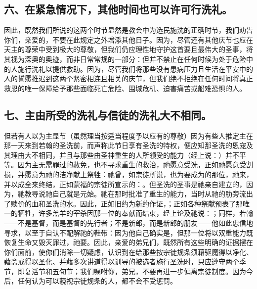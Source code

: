 
\subsection{六、在紧急情况下，其他时间也可以许可行洗礼。}

因此，既然我们所说的这两个时节显然是教会中为选民施洗的正确时节，我们劝告你们，亲爱的，不要在此规定之外增添其他日子。因为，尽管还有其他庆节也应在天主的尊荣中受到极大的尊敬，但我们仍应理性地守护这首要且最伟大的圣事，将其视为深奥的奥迹，而非日常常规的一部分：但并不禁止在任何时候为处于危险中的人施行洗礼以提供救助。因为，尽管我们将那些没有患病压力且生活在平安中的人的誓愿推迟到这两个紧密相连且相关的庆节，但我们绝不拒绝在任何时间将真正救恩的唯一保障给予那些面临死亡危险、围城危机、迫害痛苦或船难恐惧的人。\par


\subsection{七、主由所受的洗礼与信徒的洗礼大不相同。}

但若有人以为主显节（虽然理当按适当程度予以应有的尊敬）因为有些人推定主在那一天来到若翰的圣洗前，而声称此节日享有圣洗的特权，便应知那圣洗的恩宠及其理由大不相同，并且与那些由圣神重生的人所领受的能力（经上说：）并不平等。因为主无需罪过的赦免，也不寻求重生的救治，祂愿意受洗，正如祂愿意受割损，并愿意为祂的洁净献上祭牲：祂曾，如宗徒所说，也为要成为的那位，祂来，并以成全来终结，正如蒙福的宗徒所宣示的：。但圣洗的圣事是祂亲自建立的，因为，祂教导说祂自己就是元始。祂在那时批准了重生的能力，当时从祂的肋旁流出了赎价的血和圣洗的水。因此，正如旧约为新约作证，；正如各种祭献预表了那唯一的牺牲，许多羔羊的宰杀因那一位的奉献而结束，经上论及祂说：；同样，若翰——不是基督，而是基督的先行者；不是新郎，而是新郎的朋友——他如此忠信地寻求，以至于自认不配解祂的鞋带：因为他自己确实是，但那一位将以双重能力既恢复生命又毁灭罪过，祂要。因此，亲爱的弟兄们，既然所有这些明确的证据摆在你们面前，使你们消除一切疑虑，认识到在给那些按宗徒规条须藉驱魔得以净化、藉斋戒得以圣化、并藉多次讲道得以训导的被选者施行圣洗时，只应遵守两个季节，即复活节和五旬节；我们嘱咐你，弟兄，不要再进一步偏离宗徒制度。因为今后，任何认为可以藐视宗徒规条的人，都不会不受惩罚。\par

